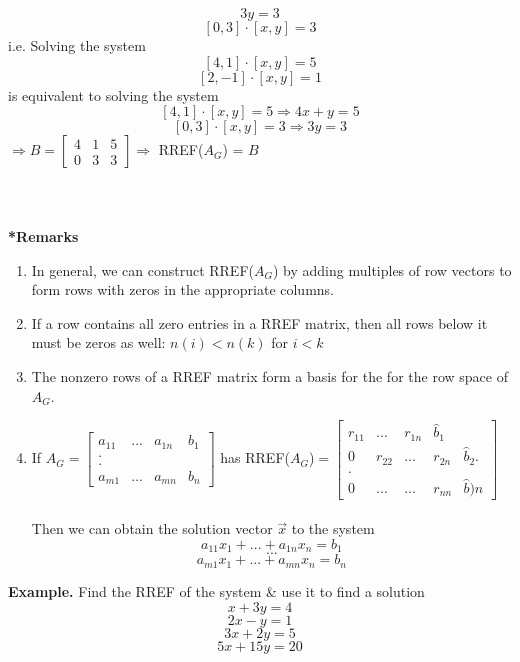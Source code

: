 \documentclass [12pt]{article}
\begin{document}
\[3y=3\]
\[[0,3]\cdot[x,y]=3\]
i.e. Solving the system 
\[[4,1]\cdot[x,y]=5\]
\[[2,-1]\cdot[x,y]=1\]
is equivalent to solving the system 
\[[4,1]\cdot[x,y]=5\Rightarrow 4x+y=5\]
\[[0,3]\cdot[x,y]=3\Rightarrow 3y=3\]
$\Rightarrow B=\begin{bmatrix}
4&1&5\\
0&3&3
\end{bmatrix}\Rightarrow$ RREF($A_G$) = $B$\\\\\\\\
\noindent\textbf{*Remarks}
\begin{enumerate}[\quad(i)]
    \item In general, we can construct RREF($A_G$) by adding multiples of row vectors to form rows with zeros in the appropriate columns.
    \item If a row contains all zero entries in a RREF matrix, then all rows below it must be zeros as well: $n(i)<n(k)$ for $i<k$
    \item The nonzero rows of a RREF matrix form a basis for the for the row space of $A_G$.
    \item If $A_G=\begin{bmatrix}
    a_{11}&...&a_{1n}&b_1\\
    .\\
    .\\
    a_{m1}&...&a_{mn}&b_n
    \end{bmatrix}$ has RREF($A_G$)$=\begin{bmatrix}
    r_{11}&...&r_{1n}&\hat{b}_1\\
    0&r_{22}&...&r_{2n}&\hat{b}_2
    .\\
    .\\
    0&...&...&r_{nn}&\hat{b})n
    \end{bmatrix}$\\\\
    Then we can  obtain the solution vector $\overrightarrow{x}$ to the system
    \[a_{11}x_1+...+a_{1n}x_n=b_1\]
    \[...\]
    \[a_{m1}x_1+...+a_{mn}x_n=b_n\]
\end{enumerate}
\noindent\textbf{Example. }Find the RREF of the system \& use it to find a solution
\[x+3y=4\]
\[2x-y=1\]
\[3x+2y=5\]
\[5x+15y=20\]
\\\\
\end{document}
